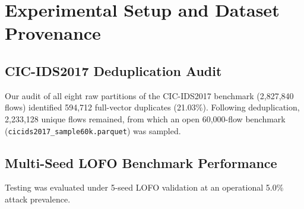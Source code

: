 \documentclass[conference]{IEEEtran}
\begin{document}
\section{Experimental Setup and Dataset Provenance}

\subsection{CIC-IDS2017 Deduplication Audit}
Our audit of all eight raw partitions of the CIC-IDS2017 benchmark (2,827,840 flows) identified 594,712 full-vector duplicates (21.03\%). Following deduplication, 2,233,128 unique flows remained, from which an open 60,000-flow benchmark (\texttt{cicids2017\_sample60k.parquet}) was sampled.

\subsection{Multi-Seed LOFO Benchmark Performance}
Testing was evaluated under 5-seed LOFO validation at an operational 5.0\% attack prevalence.
\end{document}
